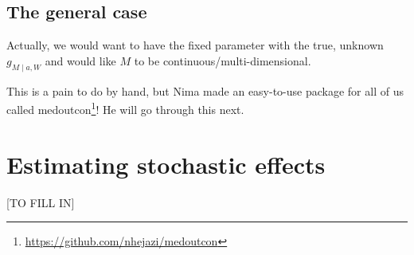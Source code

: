 \documentclass[
  12pt, krantz2,
]{book}
\makeatletter
\newenvironment{Shaded}{\begin{snugshade}}{\end{snugshade}}
\newcommand{\CommentTok}[1]{\textcolor[rgb]{0.56,0.35,0.01}{\textit{#1}}}
\newcommand{\KeywordTok}[1]{\textcolor[rgb]{0.13,0.29,0.53}{\textbf{#1}}}
\newcommand{\NormalTok}[1]{#1}
\newcommand{\OperatorTok}[1]{\textcolor[rgb]{0.81,0.36,0.00}{\textbf{#1}}}
\newcommand{\StringTok}[1]{\textcolor[rgb]{0.31,0.60,0.02}{#1}}
\renewcommand{\href}[2]{#2\footnote{\url{#1}}}
\newenvironment{kframe}{%
\medskip{}
\setlength{\fboxsep}{.8em}
 \def\at@end@of@kframe{}%
 \ifinner\ifhmode%
  \def\at@end@of@kframe{\end{minipage}}%
  \begin{minipage}{\columnwidth}%
 \fi\fi%
 \def\FrameCommand##1{\hskip\@totalleftmargin \hskip-\fboxsep
 \colorbox{shadecolor}{##1}\hskip-\fboxsep
     \hskip-\linewidth \hskip-\@totalleftmargin \hskip\columnwidth}%
 \MakeFramed {\advance\hsize-\width
   \@totalleftmargin\z@ \linewidth\hsize
   \@setminipage}}%
 {\par\unskip\endMakeFramed%
 \at@end@of@kframe}
\renewenvironment{Shaded}{\begin{kframe}}{\end{kframe}}
\theoremstyle{definition}
\theoremstyle{definition}
\theoremstyle{definition}
\newcommand{\1}{\mathbbm{1}}
\makeatother
\begin{document}
\begin{Shaded}
\end{Shaded}

\hypertarget{the-general-case}{%
\section{The general case}\label{the-general-case}}

Actually, we would want to have the fixed parameter with the true, unknown
\(g_{M \mid a, W}\) and would like \(M\) to be continuous/multi-dimensional.

This is a pain to do by hand, but Nima made an easy-to-use package for all of us
called \href{https://github.com/nhejazi/medoutcon}{medoutcon}! He will go through
this next.

\hypertarget{estimating-stochastic-effects}{%
\chapter{Estimating stochastic effects}\label{estimating-stochastic-effects}}

{[}TO FILL IN{]}

  

\backmatter
\printindex
\end{document}
